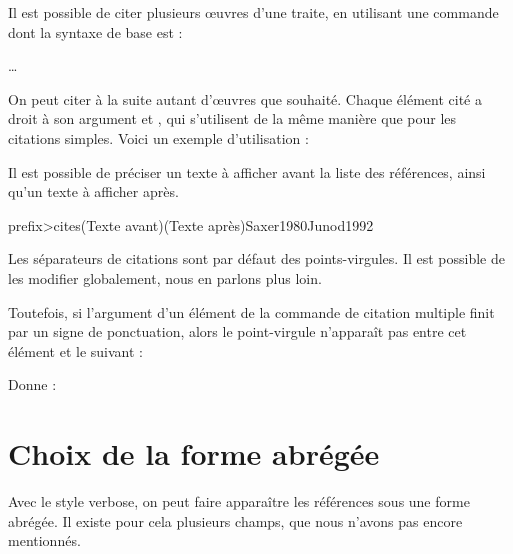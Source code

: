 Il est possible de citer plusieurs œuvres d'une traite, en  utilisant une commande dont la syntaxe de base est :

  …

On peut  citer à la suite autant d'œuvres que souhaité. Chaque élément cité a droit à son argument  et , qui s'utilisent de la même manière que pour les citations simples.
Voici un exemple d'utilisation : 

\begin{latexcode}
\autocites{Saxer1980}{Junod1992}
\end{latexcode}

\begin{quotation}
\cites{Saxer1980}{Junod1992}
\end{quotation}

Il est possible de préciser un texte à afficher avant la liste des références, ainsi qu'un texte à afficher après.

\begin{latexcode}
\<prefix>cites(Texte avant)(Texte après){Saxer1980}{Junod1992}
\end{latexcode}

Les séparateurs de citations sont par défaut des points-virgules. Il est possible de les modifier globalement, nous en parlons plus loin.

Toutefois, si l'argument  d'un élément de la commande de citation multiple finit par un signe de ponctuation, alors le point-virgule n'apparaît pas entre cet élément et le suivant :

\begin{latexcode}
\autocites[on consultera également :]{Saxer1980}{Junod1992}
\end{latexcode}

Donne :

\begin{quotation}
\cites[on consultera également :]{Saxer1980}{Junod1992}
\end{quotation}




\section{Choix de la forme abrégée}\label{shortfields}

Avec le style verbose, on peut faire apparaître les références sous une forme abrégée. Il existe pour cela plusieurs champs, que nous n'avons pas encore mentionnés.

